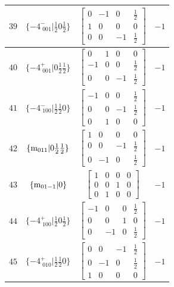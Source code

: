 \documentclass[fleqn,8pt]{jsarticle}
\begin{document}
\begin{longtable}{cccc}
$ 39 $ & $ \{-4^{-}_{\,\,001}|\frac{1}{2} 0 \frac{1}{2}\} $ & $ \begin{bmatrix} 0 & -1 & 0 & \frac{1}{2} \\ 1 & 0 & 0 & 0 \\ 0 & 0 & -1 & \frac{1}{2} \end{bmatrix} $ & $ -1 $ \\ \hline
$ 40 $ & $ \{-4^{+}_{\,\,001}|0 \frac{1}{2} \frac{1}{2}\} $ & $ \begin{bmatrix} 0 & 1 & 0 & 0 \\ -1 & 0 & 0 & \frac{1}{2} \\ 0 & 0 & -1 & \frac{1}{2} \end{bmatrix} $ & $ -1 $ \\ \hline
$ 41 $ & $ \{-4^{-}_{\,\,100}|\frac{1}{2} \frac{1}{2} 0\} $ & $ \begin{bmatrix} -1 & 0 & 0 & \frac{1}{2} \\ 0 & 0 & -1 & \frac{1}{2} \\ 0 & 1 & 0 & 0 \end{bmatrix} $ & $ -1 $ \\ \hline
$ 42 $ & $ \{{\rm m}_{011}|0 \frac{1}{2} \frac{1}{2}\} $ & $ \begin{bmatrix} 1 & 0 & 0 & 0 \\ 0 & 0 & -1 & \frac{1}{2} \\ 0 & -1 & 0 & \frac{1}{2} \end{bmatrix} $ & $ -1 $ \\ \hline
$ 43 $ & $ \{{\rm m}_{01-1}|0\} $ & $ \begin{bmatrix} 1 & 0 & 0 & 0 \\ 0 & 0 & 1 & 0 \\ 0 & 1 & 0 & 0 \end{bmatrix} $ & $ -1 $ \\ \hline
$ 44 $ & $ \{-4^{+}_{\,\,100}|\frac{1}{2} 0 \frac{1}{2}\} $ & $ \begin{bmatrix} -1 & 0 & 0 & \frac{1}{2} \\ 0 & 0 & 1 & 0 \\ 0 & -1 & 0 & \frac{1}{2} \end{bmatrix} $ & $ -1 $ \\ \hline
$ 45 $ & $ \{-4^{+}_{\,\,010}|\frac{1}{2} \frac{1}{2} 0\} $ & $ \begin{bmatrix} 0 & 0 & -1 & \frac{1}{2} \\ 0 & -1 & 0 & \frac{1}{2} \\ 1 & 0 & 0 & 0 \end{bmatrix} $ & $ -1 $ \\ \hline

\end{longtable}
\end{document}

